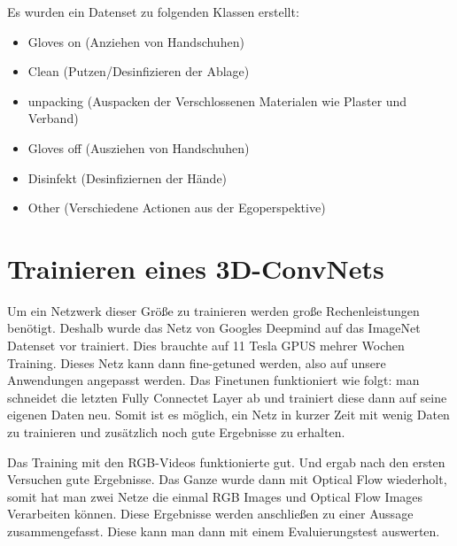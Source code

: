  Es wurden ein Datenset zu folgenden Klassen erstellt:
\begin{itemize}
\item Gloves on (Anziehen von Handschuhen)
\item Clean (Putzen/Desinfizieren der Ablage)
\item unpacking (Auspacken der Verschlossenen Materialen wie Plaster und Verband)
\item Gloves off (Ausziehen von Handschuhen)
\item Disinfekt (Desinfiziernen der Hände)
\item Other (Verschiedene Actionen aus der Egoperspektive)
\end{itemize}


\section{Trainieren eines 3D-ConvNets}
\label{sec:Trainieren}
Um ein Netzwerk dieser Größe zu trainieren werden große Rechenleistungen benötigt. Deshalb wurde das Netz von Googles Deepmind auf das ImageNet Datenset vor trainiert. Dies brauchte auf 11 Tesla GPUS mehrer Wochen Training. Dieses Netz kann dann fine-getuned werden, also auf unsere Anwendungen angepasst werden. Das Finetunen funktioniert wie folgt: man schneidet die letzten Fully Connectet Layer ab und trainiert diese dann auf seine eigenen Daten neu. Somit ist es möglich, ein Netz in kurzer Zeit mit wenig Daten zu trainieren und zusätzlich noch gute Ergebnisse zu erhalten.


Das Training mit den RGB-Videos funktionierte gut. Und ergab nach den ersten Versuchen gute Ergebnisse. Das Ganze wurde dann mit Optical Flow wiederholt, somit hat man zwei Netze die einmal RGB Images und Optical Flow Images Verarbeiten können. Diese Ergebnisse werden anschließen zu einer Aussage zusammengefasst. Diese kann man dann mit einem Evaluierungstest auswerten.
